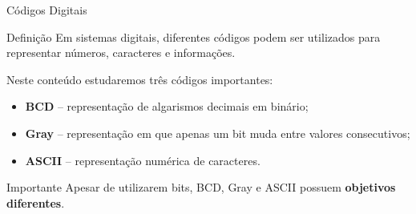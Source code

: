 
\begin{frame}{Códigos Digitais}
    \small

    \begin{block}{Definição}
        Em sistemas digitais, diferentes códigos podem ser utilizados
        para representar números, caracteres e informações.
    \end{block}

    \vspace{0.2cm}

    Neste conteúdo estudaremos três códigos importantes:

    \begin{itemize}
        \item \textbf{BCD} -- representação de algarismos decimais em binário;
        \item \textbf{Gray} -- representação em que apenas um bit muda entre valores consecutivos;
        \item \textbf{ASCII} -- representação numérica de caracteres.
    \end{itemize}

    \vspace{0.3cm}

    \begin{alertblock}{Importante}
        Apesar de utilizarem bits, BCD, Gray e ASCII possuem
        \textbf{objetivos diferentes}.
    \end{alertblock}

\end{frame}